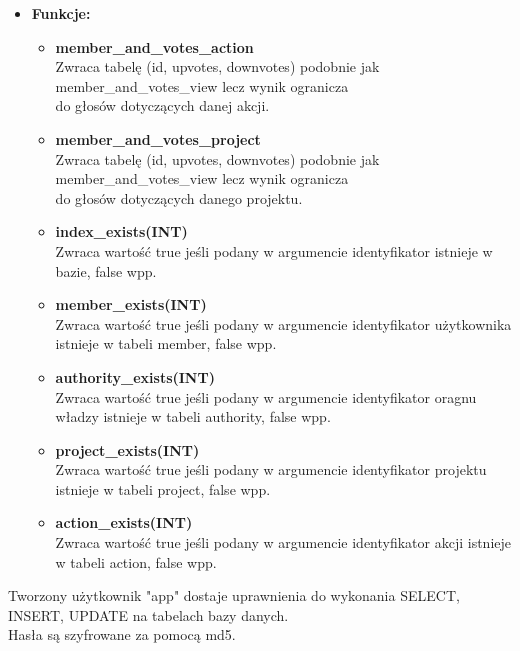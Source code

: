 \documentclass[a4paper]{article}
\begin{document}
\begin{itemize}
    \item[] \textbf{Funkcje:}
    \begin{itemize} 
        \item[] \textbf{member\_and\_votes\_action} \\ 
        Zwraca tabelę (id, upvotes, downvotes) podobnie jak member\_and\_votes\_view lecz wynik ogranicza \\
        do głosów dotyczących danej akcji.
        \item[] \textbf{member\_and\_votes\_project} \\ 
        Zwraca tabelę (id, upvotes, downvotes) podobnie jak member\_and\_votes\_view lecz wynik ogranicza \\
        do głosów dotyczących danego projektu.
        \item[] \textbf{index\_exists(INT)} \\ 
        Zwraca wartość true jeśli podany w argumencie identyfikator istnieje w bazie, false wpp.
        \item[] \textbf{member\_exists(INT)} \\ 
        Zwraca wartość true jeśli podany w argumencie identyfikator użytkownika istnieje w tabeli member, false wpp.
        \item[] \textbf{authority\_exists(INT)} \\ 
        Zwraca wartość true jeśli podany w argumencie identyfikator oragnu władzy istnieje w tabeli authority, false wpp.
        \item[] \textbf{project\_exists(INT)} \\ 
        Zwraca wartość true jeśli podany w argumencie identyfikator projektu istnieje w tabeli project, false wpp.
        \item[] \textbf{action\_exists(INT)} \\ 
        Zwraca wartość true jeśli podany w argumencie identyfikator akcji istnieje w tabeli action, false wpp.
    \end{itemize}
\end{itemize}

Tworzony użytkownik "app" dostaje uprawnienia do wykonania SELECT, INSERT, UPDATE na tabelach bazy danych.\\
Hasła są szyfrowane za pomocą md5. 
\end{document}
